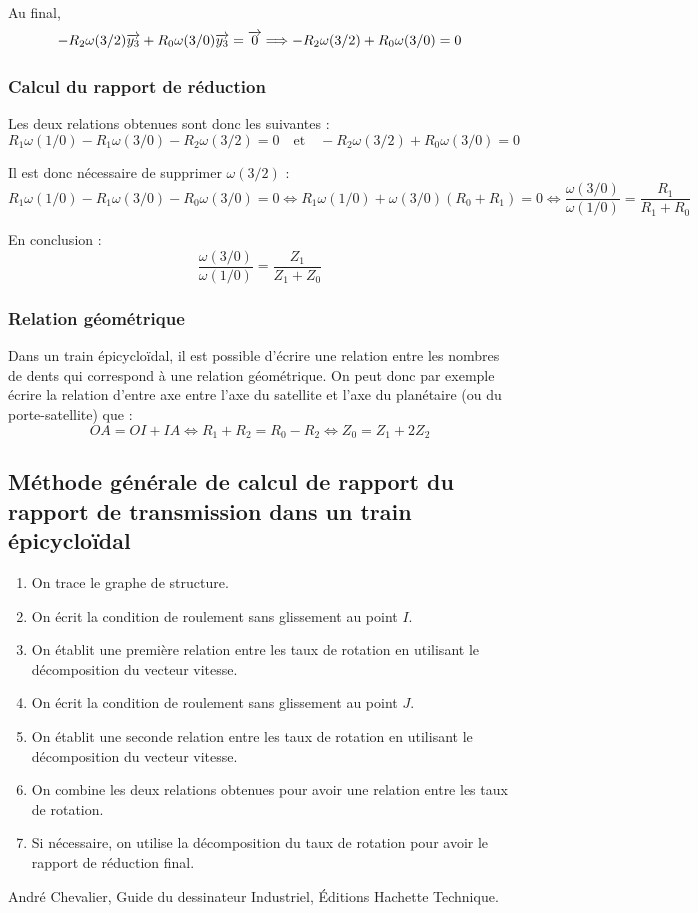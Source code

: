 \documentclass[10pt,oneside]{article}
\begin{document}
\vspace{.25cm}

Au final, 
$$
-R_2 \omega(3/2)\overrightarrow{y_3} + R_0 \omega(3/0)\overrightarrow{y_3}= \overrightarrow{0}
\Longrightarrow 
-R_2 \omega(3/2) + R_0 \omega(3/0)= 0
$$

\subsubsection{Calcul du rapport de réduction}
Les deux relations obtenues sont donc les suivantes : 
$$
R_1 \omega(1/0) -R_1 \omega(3/0)  -R_2 \omega(3/2) = 0 
\quad \text{et} \quad
-R_2 \omega(3/2) + R_0 \omega(3/0)= 0
$$

Il est donc nécessaire de supprimer $\omega(3/2)$ :
$$
R_1 \omega(1/0) -R_1 \omega(3/0) -  R_0 \omega(3/0) = 0 
\Longleftrightarrow
R_1 \omega(1/0) + \omega(3/0) \left(R_0 +R_1 \right) = 0 
\Longleftrightarrow
\dfrac{\omega(3/0)}{\omega(1/0)} = \dfrac{R_1}{R_1 +R_0}
$$

En conclusion :
$$
\dfrac{\omega(3/0)}{\omega(1/0)} = \dfrac{Z_1}{Z_1 +Z_0}
$$

\subsubsection{Relation géométrique}

Dans un train épicycloïdal, il est possible d'écrire une relation entre les nombres de dents qui correspond à une relation géométrique. On peut donc par exemple écrire la relation d'entre axe entre l'axe du satellite et l'axe du planétaire (ou du porte-satellite) que :
$$
OA = OI + IA \Longleftrightarrow 
R_1 + R_2 = R_0 - R_2
\Longleftrightarrow 
Z_0 = Z_1 + 2Z_2
$$

\subsection{Méthode générale de calcul de rapport du rapport de transmission dans un train épicycloïdal}

\begin{methode}
\begin{enumerate}
\item On trace le graphe de structure.
\item On écrit la condition de roulement sans glissement au point $I$. 
\item On établit une première relation entre les taux de rotation en utilisant le décomposition du vecteur vitesse.
\item On écrit la condition de roulement sans glissement au point $J$.
\item On établit une seconde relation  entre les taux de rotation en utilisant le décomposition du vecteur vitesse.
\item On combine les deux relations obtenues pour avoir une relation entre les taux de rotation.
\item Si nécessaire, on utilise la décomposition du taux de rotation pour avoir le rapport de réduction final.
\end{enumerate}
\end{methode}


\begin{thebibliography}{2}
 André Chevalier, Guide du dessinateur Industriel, Éditions Hachette Technique.
\end{thebibliography}
\end{document}
